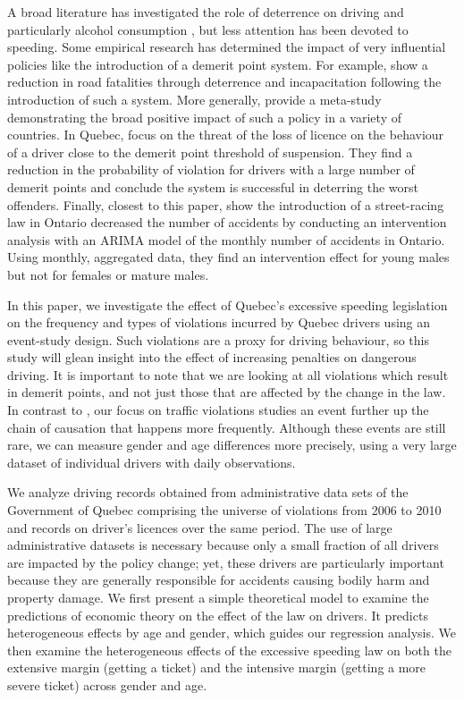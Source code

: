 A broad literature has investigated the role of deterrence on driving 
and particularly alcohol consumption 
\citep[e.g.][]{hansen2015}, 
but less attention has been devoted to speeding. 
Some empirical research has determined the impact of very influential policies 
like the introduction of a demerit point system. 
For example, 
\citet{bennedittiniNicita2009} 
show a reduction in road fatalities 
through deterrence and incapacitation following the introduction of such a system. 
More generally, 
\citet{castillocastro2012} 
provide a meta-study 
demonstrating the broad positive impact of such a policy in a variety of countries. 
In Quebec, 
\citet{dionneetal2011} 
focus on the threat of the loss of licence 
on the behaviour of a driver close to the demerit point threshold of suspension. 
They find a reduction in the probability of violation for drivers 
with a large number of demerit points and conclude 
the system is successful in deterring the worst offenders. 
Finally, closest to this paper, 
\citet{meirambayeva2014} 
show the introduction of a street-racing law in Ontario decreased the number of accidents 
by conducting an intervention analysis with an ARIMA model of 
the monthly number of accidents in Ontario.
%
Using monthly, aggregated data, 
they find an intervention effect for young males
but not for females or mature males. 


In this paper, we investigate the effect of Quebec’s excessive speeding legislation
on the frequency and types of violations incurred by Quebec drivers 
using an event-study design. 
Such violations are a proxy for driving behaviour, 
so this study will glean insight into the effect of increasing penalties on dangerous driving. 
It is important to note that we are looking at all violations which result in demerit points, 
and not just those that are affected by the change in the law. 
% 
In contrast to \citet{meirambayeva2014}, 
our focus on traffic violations
studies an event further up the chain of causation that happens more frequently. 
Although these events are still rare,
we can measure gender and age differences more precisely, 
using a very large dataset of individual drivers with daily observations. 

We analyze driving records obtained from administrative data sets 
of the Government of Quebec comprising the universe of violations 
from 2006 to 2010 and records on driver's licences over the same period. 
The use of large administrative datasets is necessary because only a small fraction 
of all drivers are impacted by the policy change; 
yet, these drivers are particularly important because they are 
generally responsible for accidents causing bodily harm and property damage. 
% 
We first present a simple theoretical model to examine the predictions of economic theory 
on the effect of the law on drivers.
%
It predicts heterogeneous effects by age and gender,  
which guides our regression analysis. 
% 
We then examine the heterogeneous effects of the excessive speeding law 
on both the extensive margin (getting a ticket) 
and the intensive margin (getting a more severe ticket) across gender and age. 


